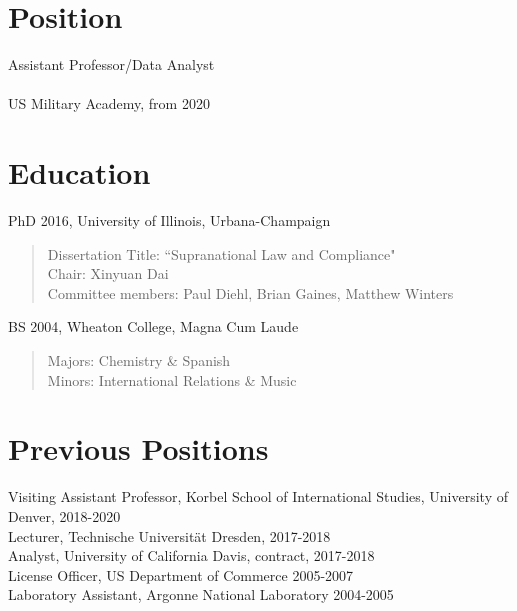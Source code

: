 \documentclass[margin, 10pt]{CVStyleTemplate}\usepackage[]{graphicx}\usepackage[dvipsnames]{xcolor}
\begin{document}
\begin{resume}

\section{Position}

Assistant Professor/Data Analyst \\
\\
US Military Academy, from 2020 \\


\section{Education}
PhD 2016, University of Illinois, Urbana-Champaign
  \begin{quotation} \noindent
  Dissertation Title: ``Supranational Law and Compliance"\\
  Chair: Xinyuan Dai\\
  Committee members: Paul Diehl, Brian Gaines, Matthew Winters
  \end{quotation}
BS 2004, Wheaton College, Magna Cum Laude
  \begin{quotation} \noindent
  Majors: Chemistry \& Spanish \\
  Minors: International Relations \& Music
  \end{quotation}
%


\section{Previous Positions}

Visiting Assistant Professor, Korbel School of International Studies, University of Denver,  2018-2020 \\
Lecturer, Technische Universit\"{a}t Dresden, 2017-2018 \\
Analyst, University of California Davis, contract, 2017-2018 \\
License Officer, US Department of Commerce 2005-2007 \\
Laboratory Assistant, Argonne National Laboratory 2004-2005 \\


\end{resume}
\end{document}
